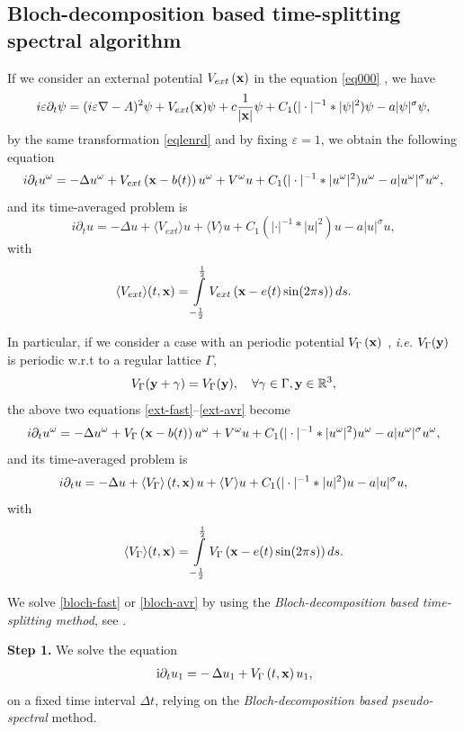\documentclass[10pt, leqno]{amsart}
\newcommand{\R}{\mathbb{R}}
\newcommand{\I}{\mathrm{i}}
\newcommand{\btu}{\Delta}
\newcommand{\gm}{\gamma}
\newcommand{\Gm}{\Gamma}
\newcommand{\fa}{\forall}
\newcommand{\ie}{{\sl i.e.\/ }}
\newcommand{\dpm}{\displaystyle}
\newcommand{\xb}{\boldsymbol{\rm{x}}}
\newcommand{\yb}{\boldsymbol{\rm{y}}}
\def\({\left(}
\def\){\right)}
\newcommand{\eps}{\varepsilon}
\begin{document}
\subsection{Bloch-decomposition based time-splitting spectral algorithm}\label{sec:2.2}
If we consider an external potential $V_{ext}\(\xb\)$ in the equation \eqref{eq000} \cite{Fri,MT},
we have
\[
i\eps\partial_t\psi=(i\eps\nabla-A)^2\psi+V_{ext}(\xb)\psi+c\frac{1}{|\xb|}\psi+C_1(|\cdot|^{-1}\ast|\psi|^2)\psi
-a|\psi|^\sigma\psi,
\]
by the same transformation \eqref{eqlenrd} and by fixing $\eps=1$, we obtain the following equation
\begin{equation}\label{ext-fast}
i\partial_tu^\omega=-\Delta u^\omega+V_{ext}\(\xb-b(t)\)u^\omega+V^\omega u
+C_1(|\cdot|^{-1}\ast|u^\omega|^2)u^\omega-a|u^\omega|^\sigma u^\omega,
\end{equation}
and its time-averaged problem is
\begin{equation}\label{ext-avr}
i\partial_tu=-\Delta u+\langle V_{ext}\rangle u+\langle V\rangle u+C_1(|\cdot|^{-1}\ast|u|^2)u-a|u|^\sigma u,
\end{equation}
with
\[\langle V_{ext}\rangle(t,\xb) = \dpm\int\limits_{-\frac{1}2}^{{\frac{1}2}} V_{ext}\left(\xb-e(t) \sin(2\pi  s)\right) ds.\]


In particular, if we consider a case with an periodic potential $V_\Gm\(\xb\)$ \cite{Fri,MT},
\ie $V_\Gm(\yb)$ is periodic w.r.t to a regular lattice $\Gm$,
\[V_\Gm(\yb+\gm)=V_\Gm(\yb), \quad \fa \gm\in\Gm, \yb\in \R^3,\]
the above two equations \eqref{ext-fast}--\eqref{ext-avr} become
\begin{equation}\label{bloch-fast}
i\partial_tu^\omega=-\Delta u^\omega+V_\Gm\(\xb-b(t)\)u^\omega+V^\omega u
+C_1(|\cdot|^{-1}\ast|u^\omega|^2)u^\omega-a|u^\omega|^\sigma u^\omega,
\end{equation}
and its time-averaged problem is
\begin{equation}\label{bloch-avr}
i\partial_tu=-\Delta u+\langle V_\Gm\rangle\(t,\xb\) u+\langle V\rangle u+C_1(|\cdot|^{-1}\ast|u|^2)u-a|u|^\sigma u,
\end{equation}
with
\[\langle V_{\Gm}\rangle(t,\xb) = \dpm\int\limits_{-\frac{1}2}^{{\frac{1}2}} V_{\Gm}\left(\xb-e(t) \sin(2\pi  s)\right) ds.\]

We solve \eqref{bloch-fast} or \eqref{bloch-avr} by using the \emph{Bloch-decomposition based time-splitting method}, see
\cite{HJMS, HJMS-2}.


\textbf{Step 1.} We solve the equation
\begin{equation}
\label{bd1}
\begin{aligned}
&\, \I \partial _t u_1 = -\, \btu u_1 +V_\Gm\(t,\xb\) u_1, \\
\end{aligned}
\end{equation}
on a fixed time interval $\Delta t$, relying on the
\emph{Bloch-decomposition based pseudo-spectral} method.
\end{document}

